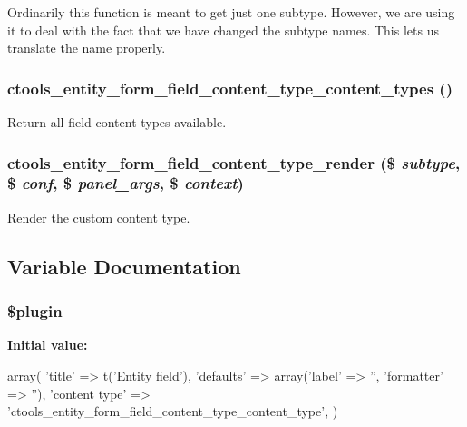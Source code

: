 Ordinarily this function is meant to get just one subtype. However, we are using it to deal with the fact that we have changed the subtype names. This lets us translate the name properly. \hypertarget{entity__form__field_8inc_a866a842a6cc10bf97b1394f9dc4e69fe}{
\subsubsection[{ctools\_\-entity\_\-form\_\-field\_\-content\_\-type\_\-content\_\-types}]{\setlength{\rightskip}{0pt plus 5cm}ctools\_\-entity\_\-form\_\-field\_\-content\_\-type\_\-content\_\-types ()}}
\label{entity__form__field_8inc_a866a842a6cc10bf97b1394f9dc4e69fe}
Return all field content types available. \hypertarget{entity__form__field_8inc_a0e49ac26ff05165b033b71cb46379573}{
\subsubsection[{ctools\_\-entity\_\-form\_\-field\_\-content\_\-type\_\-render}]{\setlength{\rightskip}{0pt plus 5cm}ctools\_\-entity\_\-form\_\-field\_\-content\_\-type\_\-render (\$ {\em subtype}, \/  \$ {\em conf}, \/  \$ {\em panel\_\-args}, \/  \$ {\em context})}}
\label{entity__form__field_8inc_a0e49ac26ff05165b033b71cb46379573}
Render the custom content type. 

\subsection{Variable Documentation}
\hypertarget{entity__form__field_8inc_ada8a7130088351710bb02ed622d6bf65}{
\subsubsection[{\$plugin}]{\setlength{\rightskip}{0pt plus 5cm}\$plugin}}
\label{entity__form__field_8inc_ada8a7130088351710bb02ed622d6bf65}
{\bfseries Initial value:}
\begin{DoxyCode}
 array(
  'title' => t('Entity field'),
  'defaults' => array('label' => '', 'formatter' => ''),
  'content type' => 'ctools_entity_form_field_content_type_content_type',
)
\end{DoxyCode}
